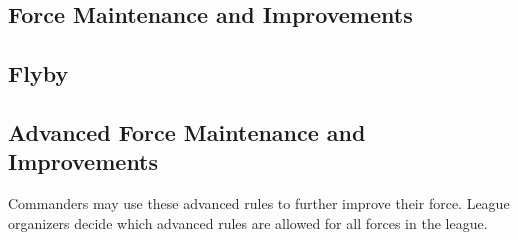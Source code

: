 

\subsection{Force Maintenance and Improvements}
\label{subsec:force_maintenance}



\newpage

\subsection{Flyby}



\newpage

\subsection{Advanced Force Maintenance and Improvements}

Commanders may use these advanced rules to further improve their force.
League organizers decide which advanced rules are allowed for all forces in the league.

